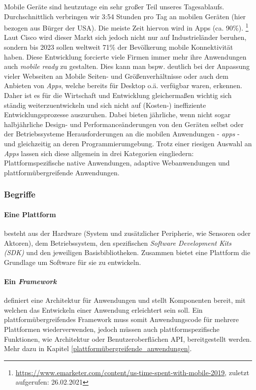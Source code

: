 Mobile Geräte sind heutzutage ein sehr großer Teil unseres Tagesablaufs. Durchschnittlich verbringen wir 3:54 Stunden pro Tag an mobilen Geräten (hier bezogen aus Bürger der USA). Die meiste Zeit hiervon wird in Apps (ca. 90\%). \footnote{\url{https://www.emarketer.com/content/us-time-spent-with-mobile-2019}, zuletzt aufgerufen: 26.02.2021} 
Laut Cisco wird dieser Markt sich jedoch nicht nur auf Industrieländer beruhen, sondern bis 2023 sollen weltweit 71\% der Bevölkerung mobile Konnektivität haben. \cite{cisco2020}
Diese Entwicklung forcierte viele Firmen immer mehr ihre Anwendungen auch \textit{mobile ready} zu gestalten. Dies kann man bspw. deutlich bei der Anpassung vieler Webseiten an Mobile Seiten- und Größenverhältnisse oder auch dem Anbieten von \textit{Apps}, welche bereits für Desktop o.ä. verfügbar waren, erkennen. \\

Daher ist es für die Wirtschaft und Entwicklung gleichermaßen wichtig sich ständig weiterzuentwickeln und sich nicht auf (Kosten-) ineffiziente Entwicklungsprozesse auszuruhen. Dabei bieten jährliche, wenn nicht sogar halbjährliche Design- und Performanceänderungen von den Geräten selbst oder der Betriebssysteme Herausforderungen an die mobilen Anwendungen - \textit{apps} - und gleichzeitig an deren Programmierumgebung. Trotz einer riesigen Auswahl an \textit{Apps} lassen sich diese allgemein in drei Kategorien eingliedern: Plattformspezifische native Anwendungen, adaptive Webanwendungen und plattformübergreifende Anwendungen.

\subsubsection{Begriffe}
\paragraph{Eine Plattform} besteht aus der Hardware (System und zusätzlicher Peripherie, wie Sensoren oder Aktoren), dem Betriebssystem, den spezifischen \textit{Software Development Kits (SDK)} und den jeweiligen Basisbibliotheken. 
Zusammen bietet eine Plattform die Grundlage um Software für sie zu entwickeln.

\paragraph{Ein \textit{Framework}} definiert eine Architektur für Anwendungen und stellt Komponenten bereit, mit welchen das Entwickeln einer Anwendung erleichtert sein soll. \cite{johnson1988} 
Ein plattformübergreifendes Framework muss somit Anwendungscode für mehrere Plattformen wiederverwenden, jedoch müssen auch plattformspezifische Funktionen, wie Architektur oder Benutzeroberflächen API, bereitgestellt werden. Mehr dazu in Kapitel \ref{plattformübergreifende_anwendungen}.

